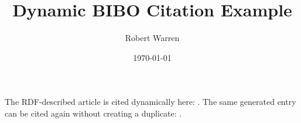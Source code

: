 \documentclass[11pt,letterpaper]{article}
\title{Dynamic BIBO Citation Example}
\author{Robert Warren}
\date{\today}
\begin{document}
\maketitle

The RDF-described article is cited dynamically here: .
The same generated entry can be cited again without creating a duplicate:
.

\printbibliography
\end{document}
